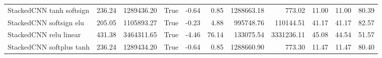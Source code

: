 \begin{tabular}{lrrlrrrrrrr}
StackedCNN tanh softsign & 236.24 & 1289436.20 & True & -0.64 & 0.85 & 1288663.18 & 773.02 & 11.00 & 11.00 & 80.39 \\
StackedCNN softsign elu & 205.05 & 1105893.27 & True & -0.23 & 4.88 & 995748.76 & 110144.51 & 41.17 & 41.17 & 82.57 \\
StackedCNN relu linear & 431.38 & 3464311.65 & True & -4.46 & 76.14 & 133075.54 & 3331236.11 & 45.08 & 44.54 & 51.57 \\
StackedCNN softplus tanh & 236.24 & 1289434.20 & True & -0.64 & 0.85 & 1288660.90 & 773.30 & 11.47 & 11.47 & 80.40 \\
\bottomrule
\end{tabular}
